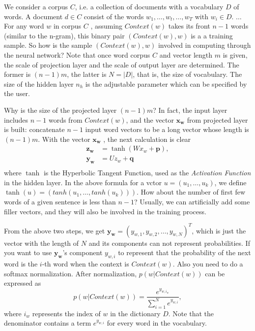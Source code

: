 We consider a corpus $C$, i.e. a collection of documents with a vocabulary $D$ of words.  A document $d\in C$ consist of the words $w_1,\ldots,w_t,\ldots,w_T$ with $w_i\in D$. $\ldots$  For any word $w$ in corpus $C$ , assuming $Context(w)$  takes its front $n-1$ words (similar to the n-gram), this binary pair $(Context (w), w)$ is a a training sample. So how is the sample $(Context (w), w)$ involved in computing through the neural network? Note that once word corpus $C$ and vector length $m$ is given, the scale of projection layer and the scale of output layer are determined. The former is $(n-1)m$, the latter is $N=|D|$, that is, the size of vocabulary. The size of the hidden layer $n_h$ is the adjustable parameter which can be specified by the user.

Why is the size of the projected layer $(n-1)m$? In fact, the input layer includes $n-1$ words from $Context(w)$, and the vector $\mathbf{x_w}$ from projected layer is built: concatenate $n-1$ input word vectors to be a long vector whose length is $(n-1)m$. With the vector $\mathbf{x_w}$ , the next calculation is clear
\begin{equation}
\left.
\begin{aligned}
\mathbf{z_w} & =  \tanh(W x_w+\mathbf{p}),\\
\mathbf{y_w} & =  U z_w + \mathbf{q}\\
\end{aligned}
\right. \label{eq:neural4}
\end{equation}
where $\tanh$ is the Hyperbolic Tangent Function, used as the \emph{Activation Function} in the hidden layer. In the above formula for a vctor $u=(u_1,\ldots,u_k)$, we define$\tanh(u)=(tanh(u_1,\ldots,tanh(u_k)))$. How about the number of first few words of a given sentence is less than $n-1$? Usually, we can artificially add some filler vectors, and they will also be involved in the training process.

From the above two steps, we get   $\mathbf{y_w}=(y_{w,1},y_{w,2},\ldots,y_{w,N})^T$, which is just the vector with the length of $N$ and its components can not represent probabilities. If you want to use $\mathbf{y_w}$'s component $y_ {w,i}$ to represent that the probability of the next word is the $i$-th word when the context is $Context(w)$. Also you need to do a softmax normalization. After normalization, $p(w|Context(w))$ can be expressed as
\begin{equation}\label{eq:softmax}
p(w|Context(w))=\frac{e^{y_{w,i_w}}}{\sum^N_{i=1}e^{y_{w,i}}},
\end{equation}
where $i_w$ represents the index of $w$ in the dictionary $D$. Note that the denominator contains a term $e^{y_{w,i}}$ for every word in the vocabulary.

